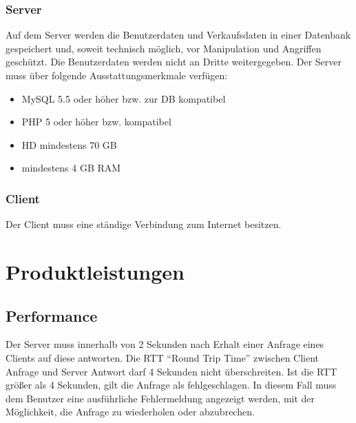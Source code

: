 \documentclass[a4paper,12pt,oneside]{scrartcl}
\begin{document}
\subsubsection*{Server}
Auf dem Server werden die Benutzerdaten und Verkaufsdaten in einer Datenbank gespeichert und, soweit technisch möglich, vor Manipulation und Angriffen geschützt.
Die Benutzerdaten werden nicht an Dritte weitergegeben.
Der Server muss über folgende Ausstattungsmerkmale verfügen:
\begin{itemize}
	\item MySQL 5.5 oder höher bzw. zur DB kompatibel
	\item PHP 5 oder höher bzw. kompatibel
	\item HD mindestens 70 GB
	\item mindestens 4 GB RAM
\end{itemize}

\subsubsection*{Client}
Der Client muss eine ständige Verbindung zum Internet besitzen.






\section{Produktleistungen}
\hypertarget{s07}{\subsection{Performance}}
Der Server muss innerhalb von 2 Sekunden nach Erhalt einer Anfrage eines Clients auf diese antworten.
Die RTT "`Round Trip Time"' zwischen Client Anfrage und Server Antwort darf 4 Sekunden nicht überschreiten.
Ist die RTT größer als 4 Sekunden, gilt die Anfrage als fehlgeschlagen.
In diesem Fall muss dem Benutzer eine ausführliche Fehlermeldung angezeigt werden, mit der Möglichkeit, die Anfrage zu wiederholen oder abzubrechen. 
\end{document}
